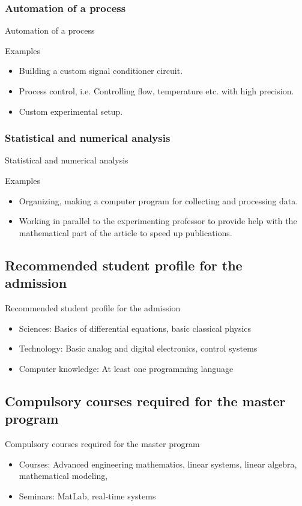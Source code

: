 \documentclass{beamer}
\begin{document}
\subsubsection{Automation of a process}
\begin{frame}{Automation of a process}
	\begin{block}{Examples}
		\begin{itemize}
			\item Building a custom signal conditioner circuit.
			\item Process control, i.e. Controlling flow, temperature etc. with high precision.
			\item Custom experimental setup.
		\end{itemize}
	\end{block}
	\framebreak
\end{frame}
\subsubsection{Statistical and numerical analysis}
\begin{frame}{Statistical and numerical analysis}
	\begin{block}{Examples}
		\begin{itemize}
			\item Organizing, making a computer program for collecting and processing data.
			\item Working in parallel to the experimenting professor to provide help with the mathematical part of the article to speed up publications.
		\end{itemize}
	\end{block}
	\framebreak
\end{frame}
\subsection{Recommended student profile for the admission}
\begin{frame}{Recommended student profile for the admission}
	\begin{itemize}
		\item Sciences: Basics of differential equations, basic classical physics
		\item Technology: Basic analog and digital electronics, control systems
		\item Computer knowledge: At least one programming language
	\end{itemize}
\end{frame}
\subsection{Compulsory courses required for the master program}
\begin{frame}{Compulsory courses required for the master program}
	\begin{itemize}
		\item Courses: Advanced engineering mathematics, linear systems, linear algebra, mathematical modeling,
		\item Seminars: MatLab, real-time systems
	\end{itemize}
\end{frame}
\end{document}
